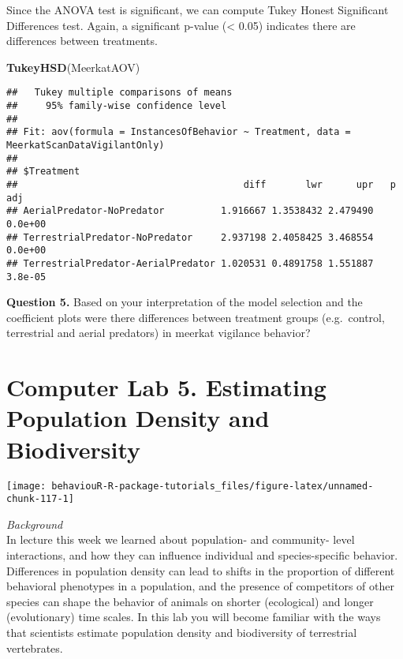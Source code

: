 \documentclass[]{book}
\newenvironment{Shaded}{\begin{snugshade}}{\end{snugshade}}
\newcommand{\KeywordTok}[1]{\textcolor[rgb]{0.13,0.29,0.53}{\textbf{#1}}}
\newcommand{\NormalTok}[1]{#1}
\begin{document}
Since the ANOVA test is significant, we can compute Tukey Honest Significant Differences test. Again, a significant p-value (\textless{} 0.05) indicates there are differences between treatments.

\begin{Shaded}
\begin{Highlighting}[]
\KeywordTok{TukeyHSD}\NormalTok{(MeerkatAOV)}
\end{Highlighting}
\end{Shaded}

\begin{verbatim}
##   Tukey multiple comparisons of means
##     95% family-wise confidence level
## 
## Fit: aov(formula = InstancesOfBehavior ~ Treatment, data = MeerkatScanDataVigilantOnly)
## 
## $Treatment
##                                        diff       lwr      upr   p adj
## AerialPredator-NoPredator          1.916667 1.3538432 2.479490 0.0e+00
## TerrestrialPredator-NoPredator     2.937198 2.4058425 3.468554 0.0e+00
## TerrestrialPredator-AerialPredator 1.020531 0.4891758 1.551887 3.8e-05
\end{verbatim}

\textbf{Question 5.} Based on your interpretation of the model selection and the coefficient plots were there differences between treatment groups (e.g.~control, terrestrial and aerial predators) in meerkat vigilance behavior?

\hypertarget{computer-lab-5.-estimating-population-density-and-biodiversity}{%
\chapter*{Computer Lab 5. Estimating Population Density and Biodiversity}\label{computer-lab-5.-estimating-population-density-and-biodiversity}}

\begin{center}\texttt{[image: behaviouR-R-package-tutorials\_files/figure-latex/unnamed-chunk-117-1]} \end{center}

\emph{Background}\\
In lecture this week we learned about population- and community- level interactions, and how they can influence individual and species-specific behavior. Differences in population density can lead to shifts in the proportion of different behavioral phenotypes in a population, and the presence of competitors of other species can shape the behavior of animals on shorter (ecological) and longer (evolutionary) time scales. In this lab you will become familiar with the ways that scientists estimate population density and biodiversity of terrestrial vertebrates.
\end{document}
